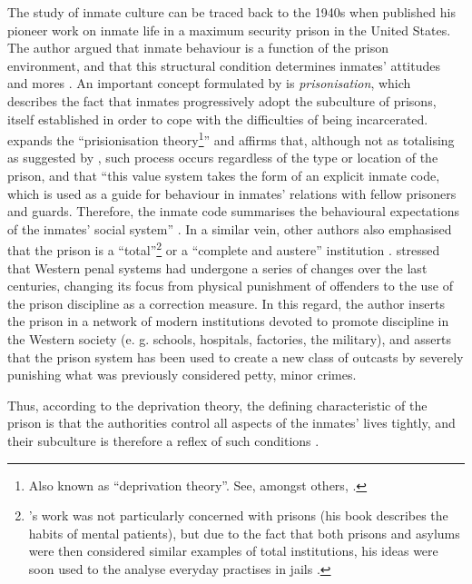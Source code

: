 The study of inmate culture can be traced back to the 1940s \citep[]{glaser1972bibliography} when \cite{clemmer1940prison} published his pioneer work on inmate life in a maximum security prison in the United States. The author argued that inmate behaviour is a function of the prison environment, and that this structural condition determines inmates' attitudes and mores \citep[62]{craddock1996comparative}. An important concept formulated by \citet[270]{clemmer1940prison} is \textit{prisonisation}, which describes the fact that inmates progressively adopt the subculture of prisons, itself established in order to cope with the difficulties of being incarcerated. \cite{sykes1958society} expands the ``prisionisation theory\footnote{Also known as ``deprivation theory''. See, amongst others, \citet[][]{mccorkle1995roots}.}'' and affirms that, although not as totalising as suggested by \citeauthor{clemmer1940prison}, such process occurs regardless of the type or location of the prison, and that ``this value system takes the form of an explicit inmate code, which is used as a guide for behaviour in inmates' relations with fellow prisoners and guards. Therefore, the inmate code summarises the behavioural expectations of the inmates' social system'' \citep[429]{paterline1999structural}. In a similar vein, other authors also emphasised that the prison is a ``total''\footnote{\citeauthor{goffman1961characteristics}'s work was not particularly concerned with prisons (his book describes the habits of mental patients), but due to the fact that both prisons and asylums were then considered similar examples of total institutions, his ideas were soon used to the analyse everyday practises in jails \citep[]{farrington1992modern}.} \citep{goffman1961characteristics} or a ``complete and austere'' institution \citep{foucault1975surveiller}. \citeauthor{foucault1975surveiller} stressed that Western penal systems had undergone a series of changes over the last centuries, changing its focus from physical punishment of offenders to the use of the prison discipline as a correction measure. In this regard, the author inserts the prison in a network of modern institutions devoted to promote discipline in the Western society (e. g. schools, hospitals, factories, the military), and asserts that the prison system has been used to create a new class of outcasts by severely punishing what was previously considered petty, minor crimes. 

Thus, according to the deprivation theory, the defining characteristic of the prison is that the authorities control all aspects of the inmates' lives tightly, and their subculture is therefore a reflex of such conditions \citep{becker2003politics}.

